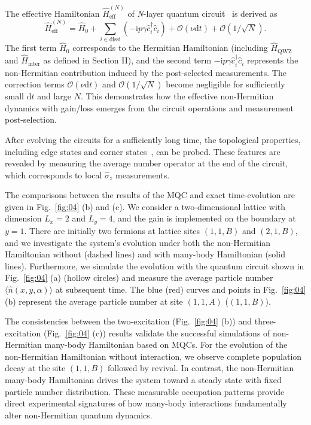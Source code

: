 \documentclass[longbibliography, aps, prx, amsmath, amssymb, amsfonts, twocolumn,superscriptaddress, footinbib]{revtex4-1}
\begin{document}
	{The effective Hamiltonian $\hat{H}_{\text{eff}}^{(N)}$ of \textit{N}-layer quantum circuit~\cite{fleckenstein2022non} is derived as}
	\begin{equation}
		{\hat{H}^{(N)}_{\text{eff}} = \hat{H}_0 + \sum_{i\in \text{dissi} } (-\mathrm{i} p\gamma \hat{c}_i^{\dagger} \hat{c}_i) + \mathcal{O}(\nu\mathrm{d} t) + \mathcal{O}(1/\sqrt{N}).\label{eq:H_scheme_new}}
	\end{equation}
	{The first term $\hat{H}_0$ corresponds to the Hermitian Hamiltonian (including $\hat{H}_{\text{QWZ}}$ and $\hat{H}_{\text{inter}}$ as defined in Section II), and the second term $-\mathrm{i} p\gamma \hat{c}_i^{\dagger} \hat{c}_i$ represents the non-Hermitian contribution induced by the post-selected measurements. The correction terms $\mathcal{O}(\nu\mathrm{d} t)$ and $\mathcal{O}(1/\sqrt{N})$ become negligible for sufficiently small $\mathrm{d}t$ and large $N$. This demonstrates how the effective non-Hermitian dynamics with gain/loss emerges from the circuit operations and measurement post-selection.}
	
	{After evolving the circuits for a sufficiently long time, the topological properties, including edge states and corner states~\cite{zou2021observation,shen2025observation}, can be probed. These features are revealed by measuring the average number operator at the end of the circuit, which corresponds to local $\hat{\sigma}_z$ measurements.}
	
	{The comparisons between the results of the MQC and exact time-evolution are given in Fig.~\ref{fig:04} (b) and (c). We consider a two-dimensional lattice with dimension $L_x=2$ and $L_y=4$, and the gain is implemented on the boundary at $y=1$. There are initially two fermions at lattice sites $(1,1,B)$ and $(2,1,B)$, and we investigate the system's evolution under both the non-Hermitian Hamiltonian without (dashed lines) and with many-body Hamiltonian (solid lines). Furthermore, we simulate the evolution with the quantum circuit shown in Fig.~\ref{fig:04} (a) (hollow circles) and measure the average particle number $\langle \hat{n}(x,y,\alpha)\rangle$ at subsequent time. The blue (red) curves and points in Fig.~\ref{fig:04} (b) represent the average particle number at site $(1,1,A)$ ($(1,1,B)$).}
	
	{The consistencies between the two-excitation (Fig.~\ref{fig:04} (b)) and three-excitation (Fig.~\ref{fig:04} (c)) results validate the successful simulations of non-Hermitian many-body Hamiltonian based on MQCs. For the evolution of the non-Hermitian Hamiltonian without interaction, we observe complete population decay at the site $(1,1,B)$ followed by revival. In contrast, the non-Hermitian many-body Hamiltonian drives the system toward a steady state with fixed particle number distribution. These measurable occupation patterns provide direct experimental signatures of how many-body interactions fundamentally alter non-Hermitian quantum dynamics.}
\end{document}
